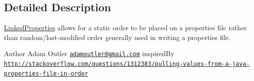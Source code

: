 \subsection{Detailed Description}
\hyperlink{class_c_a_s_u_a_l_1_1misc_1_1_linked_properties}{Linked\-Properties} allows for a static order to be placed on a properties file rather than random/last-\/modified order generally used in writing a properties file. \begin{DoxyAuthor}{Author}
Adam Outler \href{mailto:adamoutler@gmail.com}{\tt adamoutler@gmail.\-com} inspired\-By \href{http://stackoverflow.com/questions/1312383/pulling-values-from-a-java-properties-file-in-order}{\tt http\-://stackoverflow.\-com/questions/1312383/pulling-\/values-\/from-\/a-\/java-\/properties-\/file-\/in-\/order} 
\end{DoxyAuthor}



